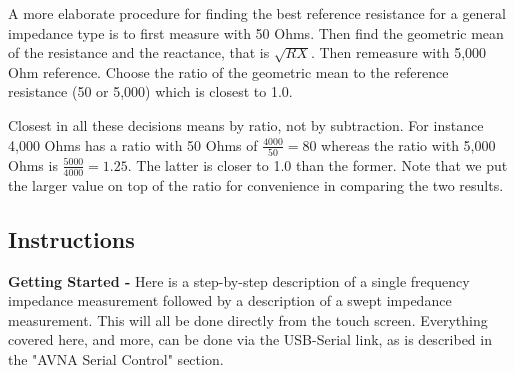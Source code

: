 A more elaborate procedure for finding the best reference resistance for a general impedance type is to first measure with 50 Ohms. Then find the geometric mean of the resistance and the reactance, that is \(\sqrt{R X}\). Then remeasure with 5,000 Ohm reference. Choose the ratio of the geometric mean to the reference resistance (50 or 5,000) which is closest to 1.0.

Closest in all these decisions means by ratio, not by subtraction. For instance 4,000 Ohms has a ratio with 50 Ohms of  \( \frac{4000}{50} = 80\) whereas the ratio with 5,000 Ohms is \( \frac{5000}{4000} = 1.25\). The latter is closer to 1.0 than the former.  Note that we put the larger value on top of the ratio for convenience in comparing the two results.
%
\subsection{Instructions}
\label{subsect:ZInstr}
\textbf{Getting Started - }Here is a step-by-step description of a single frequency impedance measurement followed by a description of a swept impedance measurement. This will all be done directly from the touch screen. Everything covered here, and more, can be done via the USB-Serial link, as is described in the "AVNA Serial Control" section.


